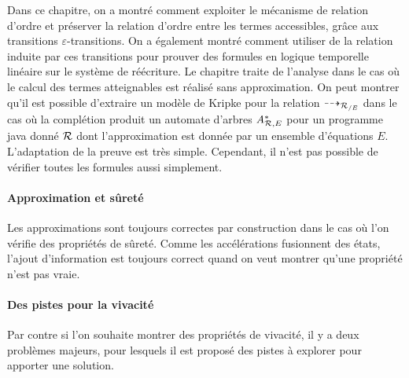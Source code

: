 Dans ce chapitre, on a montré comment
exploiter le mécanisme de relation d'ordre et préserver la relation d'ordre
entre les termes accessibles, grâce aux transitions $\varepsilon$-transitions.
On a également montré comment utiliser de la relation induite par ces transitions pour prouver des 
formules en logique temporelle linéaire sur le système de réécriture. Le chapitre traite de l'analyse 
dans le cas où le calcul des termes atteignables est réalisé sans approximation.
On peut montrer qu'il est possible d'extraire un modèle de Kripke pour la relation $\dashrightarrow_{{\mathcal R_{/E}}}$ 
dans le cas où la complétion produit un automate d'arbres ${\mathit A}_{\mathcal R,E}^*$ pour un programme java
donné $\mathcal R$ dont l'approximation est donnée par un ensemble d'équations $E$.
L'adaptation de la preuve est très simple. Cependant, il n'est pas possible de vérifier
toutes les formules aussi simplement.

\paragraph{Approximation et  sûreté}
Les approximations sont toujours correctes par construction dans le cas où l'on vérifie
des propriétés de sûreté. Comme les accélérations fusionnent des états,
l'ajout d'information est toujours correct quand on veut montrer qu'une propriété n'est pas
vraie.

\paragraph{Des pistes pour la vivacité}
Par contre si l'on souhaite montrer des propriétés de vivacité, il y a deux problèmes majeurs, pour lesquels
il est proposé des pistes à explorer pour apporter une solution.

